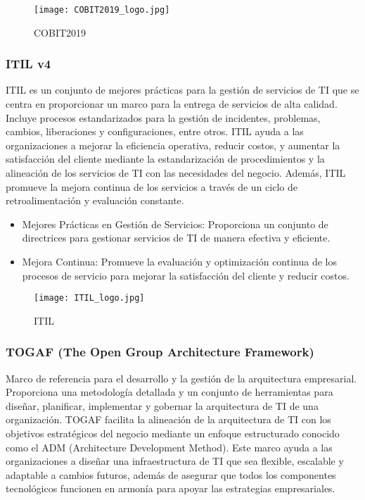         \begin{figure}[!ht]
            \centering
            \texttt{[image: COBIT2019\_logo.jpg]}
            \caption{COBIT2019}
        \end{figure}

    \subsubsection{ ITIL v4}

    ITIL es un conjunto de mejores prácticas para la gestión de servicios de TI que se centra en proporcionar un marco para la entrega de servicios de alta calidad. Incluye procesos estandarizados para la gestión de incidentes, problemas, cambios, liberaciones y configuraciones, entre otros. ITIL ayuda a las organizaciones a mejorar la eficiencia operativa, reducir costos, y aumentar la satisfacción del cliente mediante la estandarización de procedimientos y la alineación de los servicios de TI con las necesidades del negocio. Además, ITIL promueve la mejora continua de los servicios a través de un ciclo de retroalimentación y evaluación constante.

    \begin{itemize}
        \item Mejores Prácticas en Gestión de Servicios: Proporciona un conjunto de directrices para gestionar servicios de TI de manera efectiva y eficiente.
        \item Mejora Continua: Promueve la evaluación y optimización continua de los procesos de servicio para mejorar la satisfacción del cliente y reducir costos.
    \end{itemize}

    \begin{figure}[!ht]
        \centering
        \texttt{[image: ITIL\_logo.jpg]}
        \caption{ITIL}
    \end{figure}

    \subsubsection{TOGAF (The Open Group Architecture Framework)}
    Marco de referencia para el desarrollo y la gestión de la arquitectura empresarial. Proporciona una metodología detallada y un conjunto de herramientas para diseñar, planificar, implementar y gobernar la arquitectura de TI de una organización. TOGAF facilita la alineación de la arquitectura de TI con los objetivos estratégicos del negocio mediante un enfoque estructurado conocido como el ADM (Architecture Development Method). Este marco ayuda a las organizaciones a diseñar una infraestructura de TI que sea flexible, escalable y adaptable a cambios futuros, además de asegurar que todos los componentes tecnológicos funcionen en armonía para apoyar las estrategias empresariales.




